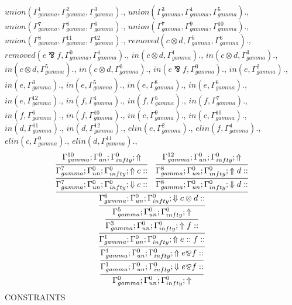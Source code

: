 \documentclass[a4paper, 11pt]{article}
\begin{document}
$union(\Gamma_{gamma}^{1}, \Gamma_{gamma}^{2}, \Gamma_{gamma}^{3}).$, $union(\Gamma_{gamma}^{3}, \Gamma_{gamma}^{4}, \Gamma_{gamma}^{5}).$, $union(\Gamma_{gamma}^{7}, \Gamma_{gamma}^{8}, \Gamma_{gamma}^{6}).$, $union(\Gamma_{gamma}^{7}, \Gamma_{gamma}^{9}, \Gamma_{gamma}^{10}).$, $union(\Gamma_{gamma}^{8}, \Gamma_{gamma}^{11}, \Gamma_{gamma}^{12}).$, $removed(c \otimes d, \Gamma_{gamma}^{5}, \Gamma_{gamma}^{6}).$, $removed(e \bindnasrepma f, \Gamma_{gamma}^{0}, \Gamma_{gamma}^{1}).$, $in(c \otimes d, \Gamma_{gamma}^{1}).$, $in(c \otimes d, \Gamma_{gamma}^{3}).$, $in(c \otimes d, \Gamma_{gamma}^{5}).$, $in(c \otimes d, \Gamma_{gamma}^{0}).$, $in(e \bindnasrepma f, \Gamma_{gamma}^{0}).$, $in(e, \Gamma_{gamma}^{2}).$, $in(e, \Gamma_{gamma}^{3}).$, $in(e, \Gamma_{gamma}^{5}).$, $in(e, \Gamma_{gamma}^{8}).$, $in(e, \Gamma_{gamma}^{6}).$, $in(e, \Gamma_{gamma}^{12}).$, $in(f, \Gamma_{gamma}^{4}).$, $in(f, \Gamma_{gamma}^{5}).$, $in(f, \Gamma_{gamma}^{7}).$, $in(f, \Gamma_{gamma}^{6}).$, $in(f, \Gamma_{gamma}^{10}).$, $in(c, \Gamma_{gamma}^{9}).$, $in(c, \Gamma_{gamma}^{10}).$, $in(d, \Gamma_{gamma}^{11}).$, $in(d, \Gamma_{gamma}^{12}).$, $elin(e, \Gamma_{gamma}^{2}).$, $elin(f, \Gamma_{gamma}^{4}).$, $elin(c, \Gamma_{gamma}^{9}).$, $elin(d, \Gamma_{gamma}^{11}).$, 
\[
\infer{\Gamma_{ gamma}^{0} ; \Gamma_{un}^{0} ; \Gamma_{ infty}^{0} ;  \Uparrow }
{\infer{\Gamma_{ gamma}^{1} ; \Gamma_{un}^{0} ; \Gamma_{ infty}^{0} ;  \Downarrow e \bindnasrepma f :: }
{\infer{\Gamma_{ gamma}^{1} ; \Gamma_{un}^{0} ; \Gamma_{ infty}^{0} ;  \Uparrow e \bindnasrepma f :: }
{\infer{\Gamma_{ gamma}^{1} ; \Gamma_{un}^{0} ; \Gamma_{ infty}^{0} ;  \Uparrow e :: f :: }
{\infer{\Gamma_{ gamma}^{3} ; \Gamma_{un}^{0} ; \Gamma_{ infty}^{0} ;  \Uparrow f :: }
{\infer{\Gamma_{ gamma}^{5} ; \Gamma_{un}^{0} ; \Gamma_{ infty}^{0} ;  \Uparrow }
{\infer{\Gamma_{ gamma}^{6} ; \Gamma_{un}^{0} ; \Gamma_{ infty}^{0} ;  \Downarrow c \otimes d :: }
{\infer{\Gamma_{ gamma}^{7} ; \Gamma_{un}^{0} ; \Gamma_{ infty}^{0} ;  \Downarrow c :: }
{\infer{\Gamma_{ gamma}^{7} ; \Gamma_{un}^{0} ; \Gamma_{ infty}^{0} ;  \Uparrow c :: }
{\Gamma_{ gamma}^{10} ; \Gamma_{un}^{0} ; \Gamma_{ infty}^{0} ;  \Uparrow }}
&
\infer{\Gamma_{ gamma}^{8} ; \Gamma_{un}^{0} ; \Gamma_{ infty}^{0} ;  \Downarrow d :: }
{\infer{\Gamma_{ gamma}^{8} ; \Gamma_{un}^{0} ; \Gamma_{ infty}^{0} ;  \Uparrow d :: }
{\Gamma_{ gamma}^{12} ; \Gamma_{un}^{0} ; \Gamma_{ infty}^{0} ;  \Uparrow }}}}}}}}}
\]
CONSTRAINTS
\end{document}
